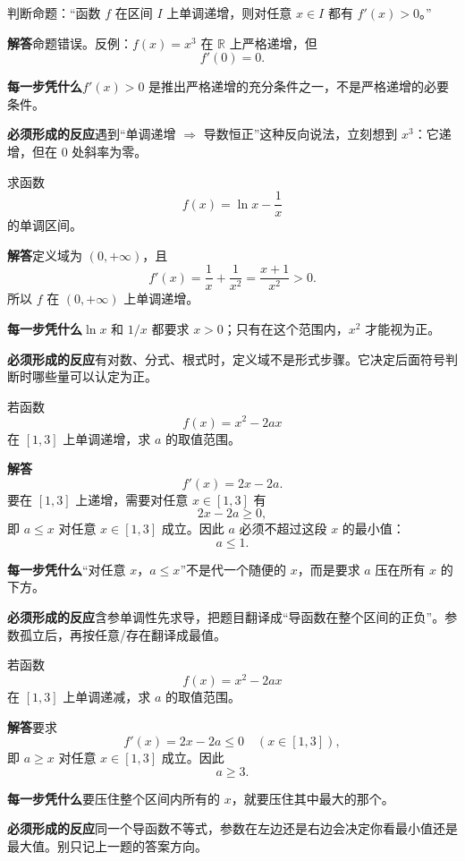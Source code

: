 \documentclass[11pt,fontset=fandol]{ctexart}
\newcommand{\R}{\mathbb R}
\newcommand{\answer}{\par\textbf{解答}\quad}
\newcommand{\basis}{\par\textbf{每一步凭什么}\quad}
\newcommand{\reaction}{\par\textbf{必须形成的反应}\quad}
\newenvironment{drill}[2]{
  \begin{tcolorbox}[colback=white,colframe=black!35,title={#1\quad\small #2},breakable]
}{\end{tcolorbox}}
\begin{document}
\begin{drill}{25. 函数递增不能反推导数处处大于零}{步步高导数单调性辨析题}
判断命题：“函数 $f$ 在区间 $I$ 上单调递增，则对任意 $x\in I$ 都有 $f'(x)>0$。”

\answer 命题错误。反例：$f(x)=x^3$ 在 $\R$ 上严格递增，但
\[
f'(0)=0.
\]

\basis $f'(x)>0$ 是推出严格递增的充分条件之一，不是严格递增的必要条件。

\reaction 遇到“单调递增 $\Rightarrow$ 导数恒正”这种反向说法，立刻想到 $x^3$：它递增，但在 $0$ 处斜率为零。
\end{drill}

\begin{drill}{26. 用导数研究单调性前先看定义域}{步步高导数单调性题型改编}
求函数
\[
f(x)=\ln x-\frac1x
\]
的单调区间。

\answer 定义域为 $(0,+\infty)$，且
\[
f'(x)=\frac1x+\frac1{x^2}=\frac{x+1}{x^2}>0.
\]
所以 $f$ 在 $(0,+\infty)$ 上单调递增。

\basis $\ln x$ 和 $1/x$ 都要求 $x>0$；只有在这个范围内，$x^2$ 才能视为正。

\reaction 有对数、分式、根式时，定义域不是形式步骤。它决定后面符号判断时哪些量可以认定为正。
\end{drill}

\begin{drill}{27. 含参单调性先把导数变成关于 $x$ 的不等式}{项目导数题库改编}
若函数
\[
f(x)=x^2-2ax
\]
在 $[1,3]$ 上单调递增，求 $a$ 的取值范围。

\answer
\[
f'(x)=2x-2a.
\]
要在 $[1,3]$ 上递增，需要对任意 $x\in[1,3]$ 有
\[
2x-2a\ge0,
\]
即 $a\le x$ 对任意 $x\in[1,3]$ 成立。因此 $a$ 必须不超过这段 $x$ 的最小值：
\[
a\le1.
\]

\basis “对任意 $x$，$a\le x$”不是代一个随便的 $x$，而是要求 $a$ 压在所有 $x$ 的下方。

\reaction 含参单调性先求导，把题目翻译成“导函数在整个区间的正负”。参数孤立后，再按任意/存在翻译成最值。
\end{drill}

\begin{drill}{28. 导数符号与参数的端点效应}{项目导数题库改编}
若函数
\[
f(x)=x^2-2ax
\]
在 $[1,3]$ 上单调递减，求 $a$ 的取值范围。

\answer 要求
\[
f'(x)=2x-2a\le0\quad(x\in[1,3]),
\]
即 $a\ge x$ 对任意 $x\in[1,3]$ 成立。因此
\[
a\ge3.
\]

\basis 要压住整个区间内所有的 $x$，就要压住其中最大的那个。

\reaction 同一个导函数不等式，参数在左边还是右边会决定你看最小值还是最大值。别只记上一题的答案方向。
\end{drill}
\end{document}

